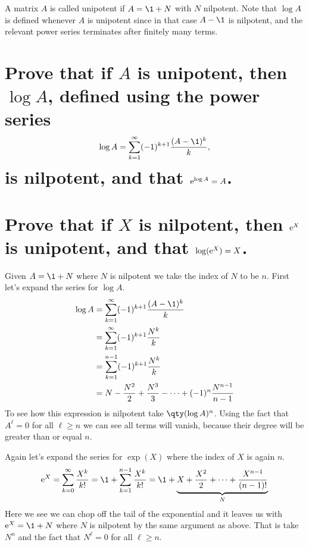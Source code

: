 \documentclass[
	pages,
	boxes,
	color=WildStrawberry
]{homework}
\begin{document}
\begin{problem}
A matrix $A$ is called unipotent if $A = \1 + N$ with $N$ nilpotent. Note that $\log A$ is defined whenever $A$ is unipotent since in that case $A - \1$ is nilpotent, and the relevant power series terminates after finitely many terms.
\begin{parts}
	\part{Prove that if $A$ is unipotent, then $\log A$, defined using the power series
		\[
			\log A = \sum_{k = 1}^{\infty} (-1)^{k + 1}\frac{(A - \1)^{k}}{k},
		\]
		is nilpotent, and that $\mathrm{e}^{\log A} = A$.}\label{part:1a}
	\part{Prove that if $X$ is nilpotent, then $\mathrm{e}^{X}$ is unipotent, and that $\log(\mathrm{e}^X) = X$.}\label{part:1b}
\end{parts}
\end{problem}

\begin{solution}
	\ref{part:1a}
	Given $A = \1 + N$ where $N$ is nilpotent we take the index of $N$ to be $n$.
	First let's expand the series for $\log A$.
	\begin{align*}
		\log A & = \sum_{k = 1}^{\infty} (-1)^{k + 1}\frac{(A - \1)^{k}}{k}                   \\
		       & = \sum_{k = 1}^{\infty} (-1)^{k + 1}\frac{N^{k}}{k}                          \\
		       & = \sum_{k = 1}^{n-1} (-1)^{k + 1}\frac{N^{k}}{k}                             \\
		       & = N - \frac{N^2}{2} + \frac{N^3}{3} - \cdots + (-1)^n\frac{N^{n - 1}}{n - 1}
	\end{align*}
	To see how this expression is nilpotent take $\qty(\log A)^n$.
	Using the fact that $A^\ell = 0$ for all $\ell \geq n$ we can see all terms will vanish, because their degree will be greater than or equal $n$.

	\ref{part:1b}
	Again let's expand the series for $\exp(X)$ where the index of $X$ is again $n$.
	\begin{equation*}
		\e^X = \sum_{k = 0}^{\infty}\frac{X^k}{k!} = \1 + \sum_{k = 1}^{n - 1} \frac{X^k}{k!} = \1 + \underbrace{X + \frac{X^2}{2} + \cdots + \frac{X^{n-1}}{(n-1)!}}_{N}
	\end{equation*}
	Here we see we can chop off the tail of the exponential and it leaves us with $\e^{X} = \1 + N$ where $N$ is nilpotent by the same argument as above.
	That is take $N^n$ and the fact that $N^\ell = 0$ for all $\ell \geq n$.
\end{solution}
\end{document}

